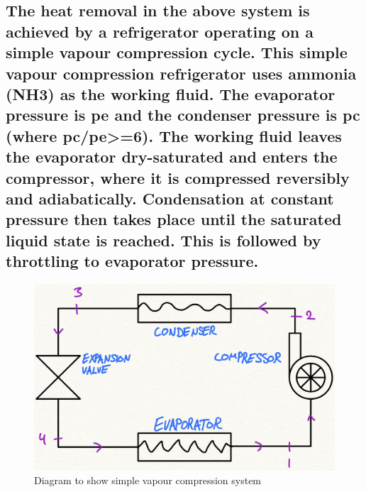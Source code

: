\documentclass[12pt]{article}
\numberwithin{equation}{section}
\begin{document}
\begin{flushleft}
\subsection{The heat removal in the above system is achieved by a refrigerator operating on a simple vapour compression cycle. This simple vapour compression refrigerator uses ammonia (NH3) as the working fluid. The evaporator pressure is pe and the condenser pressure is pc (where pc/pe>=6). The working fluid leaves the evaporator dry-saturated and enters the compressor, where it is compressed reversibly and adiabatically. Condensation at constant pressure then takes place until the saturated liquid state is reached. This is followed by throttling to evaporator pressure.}
\begin{figure}[H]
  \centering
  \includegraphics[width  = \textwidth]{./img/SystemDiagram63.png}
  \caption{Diagram to show simple vapour compression system}
\end{figure}

\end{flushleft}
\end{document}
